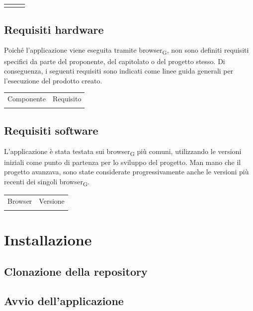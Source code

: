 \documentclass{article}
\begin{document}
{\begin{center}
\begin{tabular}{c|c|c}
\rowcolor{LightBlue}
\end{tabular}
\end{center}

\subsection{Requisiti hardware}
Poiché l'applicazione viene eseguita tramite browser\textsubscript{G}, non sono definiti requisiti specifici da parte del proponente, del capitolato o del progetto stesso. Di conseguenza, i seguenti requisiti sono indicati come linee guida generali per l'esecuzione del prodotto creato.
\begin{center}
\begin{tabular}{c|c}
\hline
\rowcolor{Blue}
Componente & Requisito \\
\rowcolor{LighterBlue}

\rowcolor{LightBlue}
\end{tabular}
\end{center}

\subsection{Requisiti software}
L'applicazione è stata testata sui browser\textsubscript{G} più comuni, utilizzando le versioni iniziali come punto di partenza per lo sviluppo del progetto. Man mano che il progetto avanzava, sono state considerate progressivamente anche le versioni più recenti dei singoli browser\textsubscript{G}.
\begin{center}
\begin{tabular}{c|c}
\hline
\rowcolor{Blue}
Browser & Versione \\
\rowcolor{LighterBlue}

\rowcolor{LightBlue}
\end{tabular}
\end{center}

\section{Installazione}
\subsection{Clonazione della repository}
\subsection{Avvio dell'applicazione}

}
\end{document}
